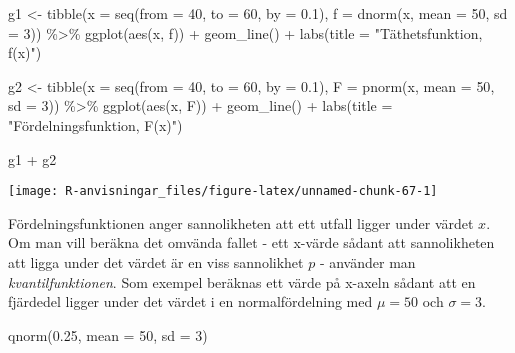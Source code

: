 \documentclass[
]{book}
\newenvironment{Shaded}{\begin{snugshade}}{\end{snugshade}}
\newcommand{\AttributeTok}[1]{\textcolor[rgb]{0.77,0.63,0.00}{#1}}
\newcommand{\DecValTok}[1]{\textcolor[rgb]{0.00,0.00,0.81}{#1}}
\newcommand{\FloatTok}[1]{\textcolor[rgb]{0.00,0.00,0.81}{#1}}
\newcommand{\FunctionTok}[1]{\textcolor[rgb]{0.00,0.00,0.00}{#1}}
\newcommand{\NormalTok}[1]{#1}
\newcommand{\OtherTok}[1]{\textcolor[rgb]{0.56,0.35,0.01}{#1}}
\newcommand{\SpecialCharTok}[1]{\textcolor[rgb]{0.00,0.00,0.00}{#1}}
\newcommand{\StringTok}[1]{\textcolor[rgb]{0.31,0.60,0.02}{#1}}
\theoremstyle{definition}
\theoremstyle{definition}
\theoremstyle{definition}
\theoremstyle{definition}
\theoremstyle{remark}
\begin{document}
\begin{Shaded}
\begin{Highlighting}[]
\NormalTok{g1 }\OtherTok{\textless{}{-}} \FunctionTok{tibble}\NormalTok{(}\AttributeTok{x =} \FunctionTok{seq}\NormalTok{(}\AttributeTok{from =} \DecValTok{40}\NormalTok{, }\AttributeTok{to =} \DecValTok{60}\NormalTok{, }\AttributeTok{by =} \FloatTok{0.1}\NormalTok{),}
             \AttributeTok{f =} \FunctionTok{dnorm}\NormalTok{(x, }\AttributeTok{mean =} \DecValTok{50}\NormalTok{, }\AttributeTok{sd =} \DecValTok{3}\NormalTok{)) }\SpecialCharTok{\%\textgreater{}\%} 
  \FunctionTok{ggplot}\NormalTok{(}\FunctionTok{aes}\NormalTok{(x, f)) }\SpecialCharTok{+} 
  \FunctionTok{geom\_line}\NormalTok{() }\SpecialCharTok{+}
  \FunctionTok{labs}\NormalTok{(}\AttributeTok{title =} \StringTok{"Täthetsfunktion, f(x)"}\NormalTok{)}

\NormalTok{g2 }\OtherTok{\textless{}{-}} \FunctionTok{tibble}\NormalTok{(}\AttributeTok{x =} \FunctionTok{seq}\NormalTok{(}\AttributeTok{from =} \DecValTok{40}\NormalTok{, }\AttributeTok{to =} \DecValTok{60}\NormalTok{, }\AttributeTok{by =} \FloatTok{0.1}\NormalTok{),}
             \AttributeTok{F =} \FunctionTok{pnorm}\NormalTok{(x, }\AttributeTok{mean =} \DecValTok{50}\NormalTok{, }\AttributeTok{sd =} \DecValTok{3}\NormalTok{)) }\SpecialCharTok{\%\textgreater{}\%} 
  \FunctionTok{ggplot}\NormalTok{(}\FunctionTok{aes}\NormalTok{(x, F)) }\SpecialCharTok{+} 
  \FunctionTok{geom\_line}\NormalTok{() }\SpecialCharTok{+}
  \FunctionTok{labs}\NormalTok{(}\AttributeTok{title =} \StringTok{"Fördelningsfunktion, F(x)"}\NormalTok{)}

\NormalTok{g1 }\SpecialCharTok{+}\NormalTok{ g2}
\end{Highlighting}
\end{Shaded}

\begin{center}\texttt{[image: R-anvisningar\_files/figure-latex/unnamed-chunk-67-1]} \end{center}

Fördelningsfunktionen anger sannolikheten att ett utfall ligger under värdet \(x\). Om man vill beräkna det omvända fallet - ett x-värde sådant att sannolikheten att ligga under det värdet är en viss sannolikhet \(p\) - använder man \emph{kvantilfunktionen}. Som exempel beräknas ett värde på x-axeln sådant att en fjärdedel ligger under det värdet i en normalfördelning med \(\mu = 50\) och \(\sigma = 3\).

\begin{Shaded}
\begin{Highlighting}[]
\FunctionTok{qnorm}\NormalTok{(}\FloatTok{0.25}\NormalTok{, }\AttributeTok{mean =} \DecValTok{50}\NormalTok{, }\AttributeTok{sd =} \DecValTok{3}\NormalTok{)}
\end{Highlighting}
\end{Shaded}
\end{document}
